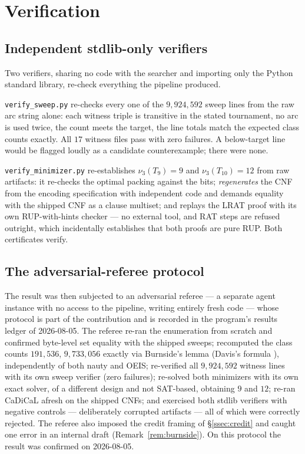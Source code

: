 \documentclass[11pt]{amsart}
\newcommand{\nut}{\nu_3}
\theoremstyle{plain}
\theoremstyle{definition}
\theoremstyle{remark}
\begin{document}
\section{Verification}\label{sec:verif}

\subsection{Independent stdlib-only verifiers}\label{ssec:stdlib}
Two verifiers, sharing no code with the searcher and importing only the
Python standard library, re-check everything the pipeline produced.

\texttt{verify\_sweep.py} re-checks every one of the $9{,}924{,}592$
sweep lines from the raw arc string alone: each witness triple is
transitive in the stated tournament, no arc is used twice, the count
meets the target, the line totals match the expected class counts
exactly. All $17$ witness files pass with zero failures. A below-target
line would be flagged loudly as a candidate counterexample; there were
none.

\texttt{verify\_minimizer.py} re-establishes $\nut(T_9)=9$ and
$\nut(T_{10})=12$ from raw artifacts: it re-checks the optimal packing
against the bits; \emph{regenerates} the CNF from the encoding
specification with independent code and demands equality with the
shipped CNF as a clause multiset; and replays the LRAT proof with its
own RUP-with-hints checker --- no external tool, and RAT steps are
refused outright, which incidentally establishes that both proofs are
pure RUP. Both certificates verify.

\subsection{The adversarial-referee protocol}\label{ssec:referee}
The result was then subjected to an adversarial referee --- a separate
agent instance with no access to the pipeline, writing entirely fresh
code --- whose protocol is part of the contribution and is recorded in
the program's results ledger of 2026-08-05. The referee re-ran the
enumeration from scratch and confirmed byte-level set equality with the
shipped sweeps; recomputed the class counts $191{,}536$, $9{,}733{,}056$
exactly via Burnside's lemma (Davis's formula \cite{Davis54}),
independently of both nauty and OEIS;
re-verified all $9{,}924{,}592$ witness lines with its own sweep
verifier (zero failures); re-solved both minimizers with its own exact
solver, of a different design and not SAT-based, obtaining $9$ and $12$;
re-ran CaDiCaL afresh on the shipped CNFs; and exercised both stdlib
verifiers with negative controls --- deliberately corrupted artifacts
--- all of which were correctly rejected. The referee also imposed the
credit framing of \S\ref{ssec:credit} and caught one error in an
internal draft (Remark~\ref{rem:burnside}). On this protocol the result
was confirmed on 2026-08-05.
\end{document}
